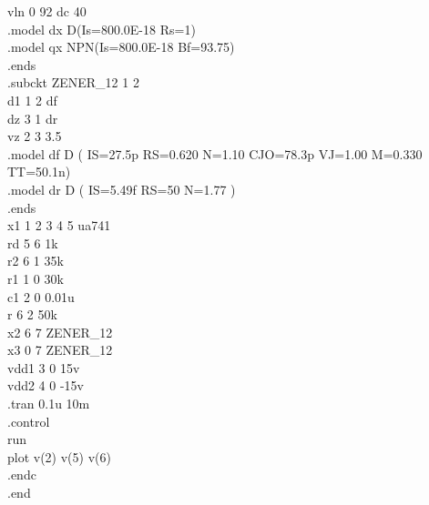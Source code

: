 \documentclass[12pt]{article}
\begin{document}
vln   0 92 dc 40\\
.model dx D(Is=800.0E-18 Rs=1)\\
.model qx NPN(Is=800.0E-18 Bf=93.75)\\
.ends\\
\newpage
.subckt ZENER\_12 1 2\\
d1 1 2 df\\
dz 3 1 dr\\
vz 2 3 3.5\\
.model df D ( IS=27.5p RS=0.620 N=1.10 CJO=78.3p VJ=1.00 M=0.330 TT=50.1n)\\
.model dr D ( IS=5.49f RS=50 N=1.77 )\\
.ends\\
x1 1 2 3 4 5 ua741\\
rd 5 6 1k\\
r2 6 1 35k\\
r1 1 0 30k \\
c1 2 0 0.01u\\
r 6 2 50k\\
x2 6 7 ZENER_12\\
x3 0 7 ZENER_12\\
vdd1 3 0 15v\\
vdd2 4 0 -15v\\
.tran 0.1u 10m\\
.control\\
run\\
plot v(2) v(5) v(6)\\
.endc\\
.end\\
\newpage
\end{document}
